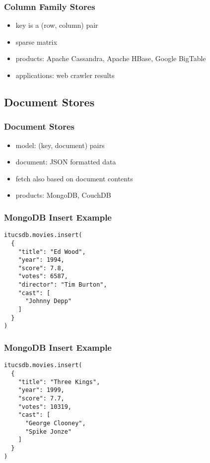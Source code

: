 \documentclass[dvipsnames]{beamer}
\theoremstyle{plain}
\begin{document}
\begin{frame}
  \frametitle{Column Family Stores}

  \begin{itemize}
    \item key is a (row, column) pair
    \item sparse matrix
    \item products: Apache Cassandra, Apache HBase, Google BigTable
    \item applications: web crawler results
  \end{itemize}
\end{frame}

\subsection{Document Stores}

\begin{frame}
  \frametitle{Document Stores}

  \begin{itemize}
    \item model: (key, document) pairs
    \item document: JSON formatted data
    \item fetch also based on document contents
    \item products: MongoDB, CouchDB
  \end{itemize}
\end{frame}

\begin{frame}[fragile]
  \frametitle{MongoDB Insert Example}

  \begin{lstlisting}
itucsdb.movies.insert(
  {
    "title": "Ed Wood",
    "year": 1994,
    "score": 7.8,
    "votes": 6587,
    "director": "Tim Burton",
    "cast": [
      "Johnny Depp"
    ]
  }
)
  \end{lstlisting}
\end{frame}

\begin{frame}[fragile]
  \frametitle{MongoDB Insert Example}

  \begin{lstlisting}
itucsdb.movies.insert(
  {
    "title": "Three Kings",
    "year": 1999,
    "score": 7.7,
    "votes": 10319,
    "cast": [
      "George Clooney",
      "Spike Jonze"
    ]
  }
)
  \end{lstlisting}
\end{frame}
\end{document}
